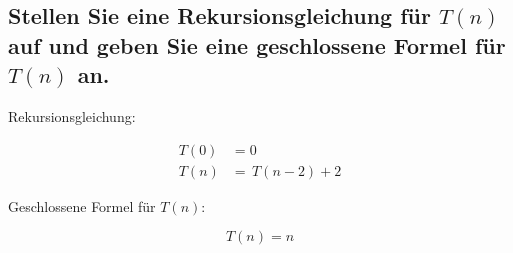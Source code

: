 \documentclass{article}
\begin{document}
\subsection{Stellen Sie eine Rekursionsgleichung für $T(n)$ auf und geben Sie eine geschlossene Formel für $T(n)$ an.}

Rekursionsgleichung:

\begin{align*}
	T(0) & = 0 \\
	T(n) & = \, T(n - 2) + 2
\end{align*}

\vspace{1em}

\begin{flushleft}
	Geschlossene Formel für $T(n)$:
\end{flushleft}

$$T(n) = n$$
\end{document}
